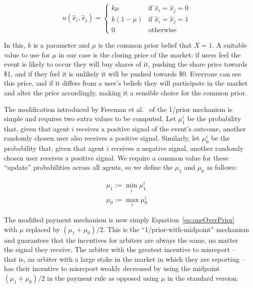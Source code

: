 \begin{equation}
	\label{eq:oneOverPrior}
	u(\hat{x}_i, \hat{x}_j) =
	\begin{cases}
		k \mu & \text{if } \hat{x}_i = \hat{x}_j = 0 \\
		k (1-\mu) & \text{if } \hat{x}_i = \hat{x}_j = 1 \\
		0 & \text{otherwise}
	\end{cases}
\end{equation}

In this, $k$ is a parameter and $\mu$ is the common prior belief that $X=1$. A
suitable value to use for $\mu$ in our case is the closing price of the market:
if users feel the event is likely to occur they will buy shares of it, pushing
the share price towards \$1, and if they feel it is unlikely it will be pushed
towards \$0. Everyone can see this price, and if it differs from a user's
beliefs they will participate in the market and alter the price accordingly,
making it a sensible choice for the common prior.

The modification introduced by Freeman et al.~\cite{Freeman2017} of the 1/prior
mechanism is simple and requires two extra values to be computed. Let $\mu_1^i$
be the probability that, given that agent $i$ receives a positive signal of the
event's outcome, another randomly chosen user also receives a positive signal.
Similarly, let $\mu_0^i$ be the probability that, given that agent $i$ receives
a negative signal, another randomly chosen user receives a positive signal. We
require a common value for these ``update'' probabilities across all agents, so
we define the $\mu_1$ and $\mu_0$ as follows:

\begin{equation}
	\begin{gathered}
		\mu_1 := \min_i \mu_1^i \\
		\mu_0 := \max_i \mu_0^i
	\end{gathered}
\end{equation}

The modified payment mechanism is now simply Equation~\ref{eq:oneOverPrior}
with $\mu$ replaced by $(\mu_1 + \mu_0)/2$. This is the
``1/prior-with-midpoint'' mechanism and guarantees that the incentives for
arbiters are always the same, no matter the signal they receive. The arbiter
with the greatest incentive to misreport -- that is, an arbiter with a large
stake in the market in which they are reporting -- has their incentive to
misreport weakly decreased by using the midpoint $(\mu_1 + \mu_0)/2$ in the
payment rule as opposed using $\mu$ in the standard version.

